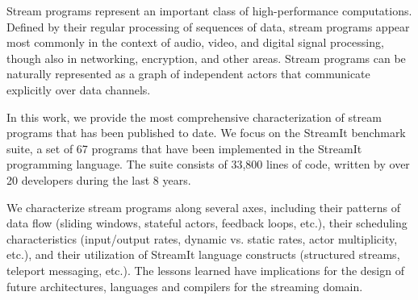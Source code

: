 Stream programs represent an important class of high-performance
computations.  Defined by their regular processing of sequences of
data, stream programs appear most commonly in the context of audio,
video, and digital signal processing, though also in networking,
encryption, and other areas.  Stream programs can be naturally
represented as a graph of independent actors that communicate
explicitly over data channels.

In this work, we provide the most comprehensive characterization of
stream programs that has been published to date.  We focus on the
StreamIt benchmark suite, a set of 67 programs that have been
implemented in the StreamIt programming language.  The suite consists
of 33,800 lines of code, written by over 20 developers during the last
8 years.

We characterize stream programs along several axes, including their
patterns of data flow (sliding windows, stateful actors, feedback
loops, etc.), their scheduling characteristics (input/output rates,
dynamic vs. static rates, actor multiplicity, etc.), and their
utilization of StreamIt language constructs (structured streams,
teleport messaging, etc.).  The lessons learned have implications for
the design of future architectures, languages and compilers for the
streaming domain.

